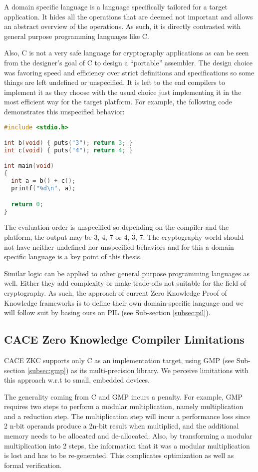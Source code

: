 A domain specific language is a language specifically tailored for a
target application. It hides all the operations that are deemed not
important and allows an abstract overview of the operations. As such,
it is directly contrasted with general purpose programming languages
like C.

Also, C is not a very safe language for cryptography applications as
can be seen from the designer's goal of C to design a ``portable''
assembler. The design choice was favoring speed and efficiency over
strict definitions and specifications so some things are left
undefined or unspecified. It is left to the end compilers to implement
it as they choose with the usual choice just implementing it in the
most efficient way for the target platform. For example, the following
code demonstrates this unspecified behavior:

\begin{lstlisting}[language=C]
#include <stdio.h>

int b(void) { puts("3"); return 3; }
int c(void) { puts("4"); return 4; }

int main(void)
{
  int a = b() + c();
  printf("%d\n", a);

  return 0;
}
\end{lstlisting}

The evaluation order is unspecified so depending on the compiler and
the platform, the output may be 3, 4, 7 or 4, 3, 7. The cryptography
world should not have neither undefined nor unspecified behaviors and
for this a domain specific language is a key point of this thesis.

Similar logic can be applied to other general purpose programming
languages as well. Either they add complexity or make trade-offs not
suitable for the field of cryptography. As such, the approach of
current Zero Knowledge Proof of Knowledge frameworks is to define
their own domain-specific language and we will follow suit by basing
ours on PIL (see Sub-section \ref{subsec:pil}).

\subsection{CACE Zero Knowledge Compiler Limitations}

CACE ZKC supports only C as an implementation target, using GMP (see
Sub-section \ref{subsec:gmp}) as its multi-precision library. We
perceive limitations with this approach w.r.t to small, embedded
devices.

The generality coming from C and GMP incurs a penalty. For example, GMP
requires two steps to perform a modular multiplication, namely
multiplication and a reduction step. The multiplication step will
incur a performance loss since 2 n-bit operands produce a 2n-bit
result when multiplied, and the additional memory needs to be
allocated and de-allocated. Also, by transforming a modular
multiplication into 2 steps, the information that it was a modular
multiplication is lost and has to be re-generated. This complicates
optimization as well as formal verification.

